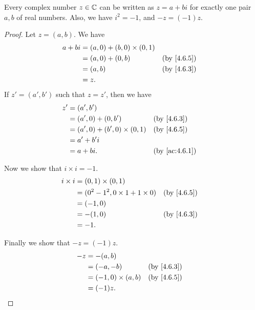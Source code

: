 \begin{lem}\label{4.6.7}
  Every complex number \(z \in \mathbb{C}\) can be written as \(z = a + bi\) for exactly one pair \(a, b\) of real numbers.
  Also, we have \(i^2 = -1\), and \(-z = (-1)z\).
\end{lem}

\begin{proof}
  Let \(z = (a, b)\).
  We have
  \begin{align*}
    a + bi & = (a, 0) + (b, 0) \times (0, 1)                 \\
           & = (a, 0) + (0, b)               &  & \by{4.6.5} \\
           & = (a, b)                        &  & \by{4.6.3} \\
           & = z.
  \end{align*}
  If \(z' = (a', b')\) such that \(z = z'\), then we have
  \begin{align*}
    z' & = (a', b')                                                         \\
       & = (a', 0) + (0, b')               &  & \by{4.6.3}                  \\
       & = (a', 0) + (b', 0) \times (0, 1) &  & \by{4.6.5}                  \\
       & = a' + b' i                                                        \\
       & = a + bi.                         &  & \text{(by \cref{ac:4.6.1})}
  \end{align*}

  Now we show that \(i \times i = -1\).
  \begin{align*}
    i \times i & = (0, 1) \times (0, 1)                                 \\
               & = (0^2 - 1^2, 0 \times 1 + 1 \times 0) &  & \by{4.6.5} \\
               & = (-1, 0)                                              \\
               & = -(1, 0)                              &  & \by{4.6.3} \\
               & = -1.
  \end{align*}

  Finally we show that \(-z = (-1) z\).
  \begin{align*}
    -z & = -(a, b)                               \\
       & = (-a, -b)              &  & \by{4.6.3} \\
       & = (-1, 0) \times (a, b) &  & \by{4.6.5} \\
       & = (-1) z.
  \end{align*}
\end{proof}

